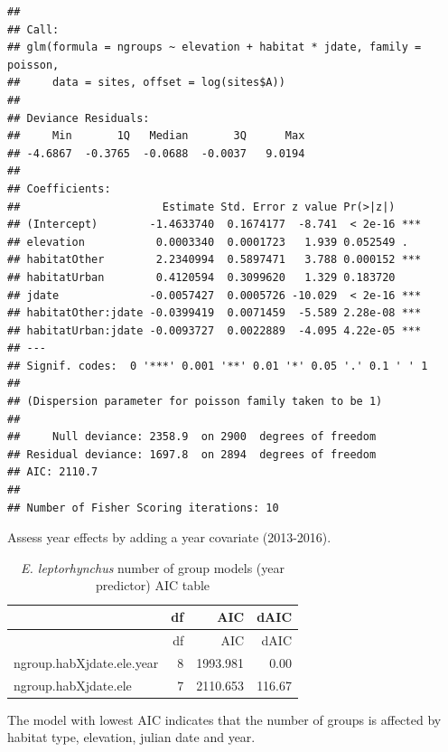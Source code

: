 \documentclass[]{article}
\begin{document}
\begin{verbatim}
## 
## Call:
## glm(formula = ngroups ~ elevation + habitat * jdate, family = poisson, 
##     data = sites, offset = log(sites$A))
## 
## Deviance Residuals: 
##     Min       1Q   Median       3Q      Max  
## -4.6867  -0.3765  -0.0688  -0.0037   9.0194  
## 
## Coefficients:
##                      Estimate Std. Error z value Pr(>|z|)    
## (Intercept)        -1.4633740  0.1674177  -8.741  < 2e-16 ***
## elevation           0.0003340  0.0001723   1.939 0.052549 .  
## habitatOther        2.2340994  0.5897471   3.788 0.000152 ***
## habitatUrban        0.4120594  0.3099620   1.329 0.183720    
## jdate              -0.0057427  0.0005726 -10.029  < 2e-16 ***
## habitatOther:jdate -0.0399419  0.0071459  -5.589 2.28e-08 ***
## habitatUrban:jdate -0.0093727  0.0022889  -4.095 4.22e-05 ***
## ---
## Signif. codes:  0 '***' 0.001 '**' 0.01 '*' 0.05 '.' 0.1 ' ' 1
## 
## (Dispersion parameter for poisson family taken to be 1)
## 
##     Null deviance: 2358.9  on 2900  degrees of freedom
## Residual deviance: 1697.8  on 2894  degrees of freedom
## AIC: 2110.7
## 
## Number of Fisher Scoring iterations: 10
\end{verbatim}

Assess year effects by adding a year covariate (2013-2016).

\begin{longtable}[]{@{}lrrr@{}}
\caption{\textit{E. leptorhynchus} number of group models (year
predictor) AIC table}\tabularnewline
\toprule
& df & AIC & dAIC\tabularnewline
\midrule
\endfirsthead
\toprule
& df & AIC & dAIC\tabularnewline
\midrule
\endhead
ngroup.habXjdate.ele.year & 8 & 1993.981 & 0.00\tabularnewline
ngroup.habXjdate.ele & 7 & 2110.653 & 116.67\tabularnewline
\bottomrule
\end{longtable}

The model with lowest AIC indicates that the number of groups is
affected by habitat type, elevation, julian date and year.
\end{document}

